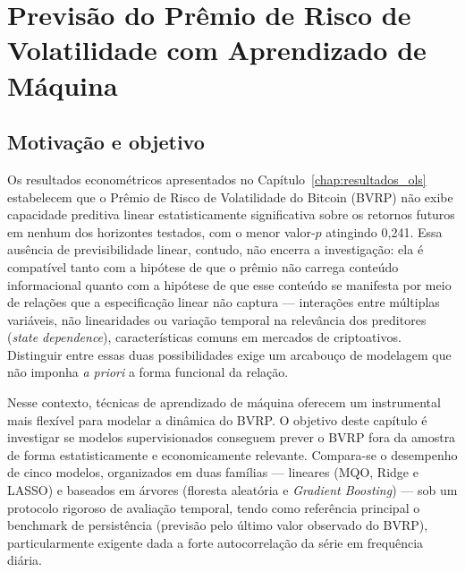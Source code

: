 ﻿%

\chapter{Previsão do Prêmio de Risco de Volatilidade com Aprendizado de Máquina}
\label{chap:cap5_ml}

\section{Motivação e objetivo}
\label{sec:cap5_motivacao}

Os resultados econométricos apresentados no Capítulo~\ref{chap:resultados_ols} estabelecem que o Prêmio de Risco de Volatilidade do Bitcoin (BVRP) não exibe capacidade preditiva linear estatisticamente significativa sobre os retornos futuros em nenhum dos horizontes testados, com o menor valor-$p$ atingindo 0,241. Essa ausência de previsibilidade linear, contudo, não encerra a investigação: ela é compatível tanto com a hipótese de que o prêmio não carrega conteúdo informacional quanto com a hipótese de que esse conteúdo se manifesta por meio de relações que a especificação linear não captura --- interações entre múltiplas variáveis, não linearidades ou variação temporal na relevância dos preditores (\textit{state dependence}), características comuns em mercados de criptoativos. Distinguir entre essas duas possibilidades exige um arcabouço de modelagem que não imponha \textit{a priori} a forma funcional da relação.

Nesse contexto, técnicas de aprendizado de máquina oferecem um instrumental mais
flexível para modelar a dinâmica do BVRP. O objetivo deste capítulo é investigar se
modelos supervisionados conseguem prever o BVRP fora da amostra de forma
estatisticamente e economicamente relevante. Compara-se o desempenho de cinco
modelos, organizados em duas famílias --- lineares (MQO, Ridge e LASSO) e
baseados em árvores (floresta aleatória e \textit{Gradient Boosting}) --- sob um
protocolo rigoroso de avaliação temporal, tendo como referência principal o
benchmark de persistência (previsão pelo último valor observado do BVRP),
particularmente exigente dada a forte autocorrelação da série em frequência diária.

